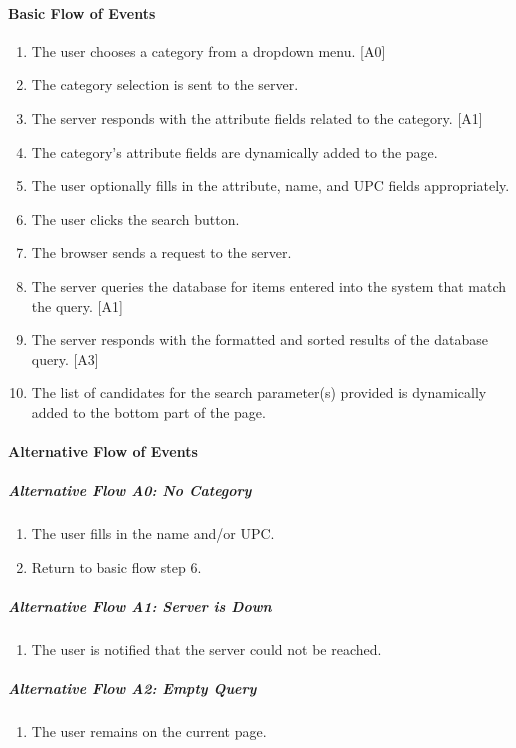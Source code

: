 \documentclass{article}
\begin{document}
\paragraph{Basic Flow of Events}
\begin{enumerate}
\item The user chooses a category from a dropdown menu. [A0]
\item The category selection is sent to the server.
\item The server responds with the attribute fields related to the category. [A1]
\item The category's attribute fields are dynamically added to the page.
\item The user optionally fills in the attribute, name, and UPC fields appropriately.
\item The user clicks the search button.
\item The browser sends a request to the server.
\item The server queries the database for items entered into the system that match the query. [A1]
\item The server responds with the formatted and sorted results of the database query. [A3]
\item The list of candidates for the search parameter(s) provided is dynamically added to the bottom part of the page.
\end{enumerate}

\paragraph{Alternative Flow of Events}

\subparagraph{Alternative Flow A0: No Category}
\begin{enumerate}
\item The user fills in the name and/or UPC.
\item Return to basic flow step 6.
\end{enumerate}

\subparagraph{Alternative Flow A1: Server is Down}
\begin{enumerate}
\item The user is notified that the server could not be reached.
\end{enumerate}

\subparagraph{Alternative Flow A2: Empty Query}
\begin{enumerate}
\item The user remains on the current page.
\end{enumerate}
\end{document}
